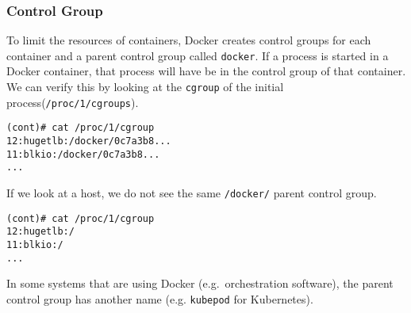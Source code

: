 \subsubsection{Control Group}
To limit the resources of containers, Docker creates control groups for each container and a parent control group called \lstinline{docker}. If a process is started in a Docker container, that process will have be in the control group of that container. We can verify this by looking at the \lstinline{cgroup} of the initial process(\lstinline{/proc/1/cgroups})\cite{Metasploit-Linux-Gather-Container-Detection}.

\begin{lstlisting}[caption={Process control group inside container\protect\footnotemark.},captionpos=b]
(cont)# cat /proc/1/cgroup
12:hugetlb:/docker/0c7a3b8...
11:blkio:/docker/0c7a3b8...
...
\end{lstlisting}

If we look at a host, we do not see the same \lstinline{/docker/} parent control group.
\begin{lstlisting}[caption={Process control groups on host.},captionpos=b]
(cont)# cat /proc/1/cgroup
12:hugetlb:/
11:blkio:/
...
\end{lstlisting}

In some systems that are using Docker (e.g.\ orchestration software), the parent control group has another name (e.g. \lstinline{kubepod} for Kubernetes).

